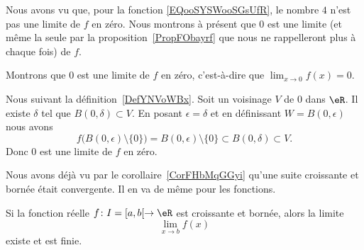 \begin{example}
    Nous avons vu que, pour la fonction \eqref{EQooSYSWooSGsUfR}, le nombre \( 4\) n'est pas une limite de \( f\) en zéro. Nous montrons à présent que \( 0\) est une limite (et même la seule par la proposition~\ref{PropFObayrf} que nous ne rappelleront plus à chaque fois) de \( f\).

    Montrons que \( 0\) est une limite de \( f\) en zéro, c'est-à-dire que \( \lim_{x\to 0} f(x)=0\).

    Nous suivant la définition~\ref{DefYNVoWBx}. Soit un voisinage \( V\) de \( 0\) dans \( \eR\). Il existe \( \delta\) tel que \( B(0,\delta)\subset V\). En posant \( \epsilon=\delta\) et en définissant \( W=B(0,\epsilon)\) nous avons
    \begin{equation}
        f\big( B(0,\epsilon)\setminus\{ 0 \} \big)=B(0,\epsilon)\setminus\{ 0 \}\subset  B(0,\delta)\subset V.
    \end{equation}
    Donc \( 0\) est une limite de \( f\) en zéro.
\end{example}

Nous avons déjà vu par le corollaire~\ref{CorFHbMqGGyi} qu'une suite croissante et bornée était convergente. Il en va de même pour les fonctions.
\begin{proposition} \label{PropMTmBYeU}
    Si la fonction réelle \( f\colon I=\mathopen[ a , b [\to \eR\) est croissante et bornée, alors la limite
    \begin{equation}
        \lim_{x\to b} f(x)
    \end{equation}
    existe et est finie.
\end{proposition}

